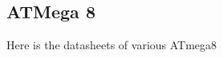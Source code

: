 \addappheadtotoc
\begin{appendices}
\chapter{ATMega 8}%
Here is the datasheets of various ATmega8

\end{appendices}

